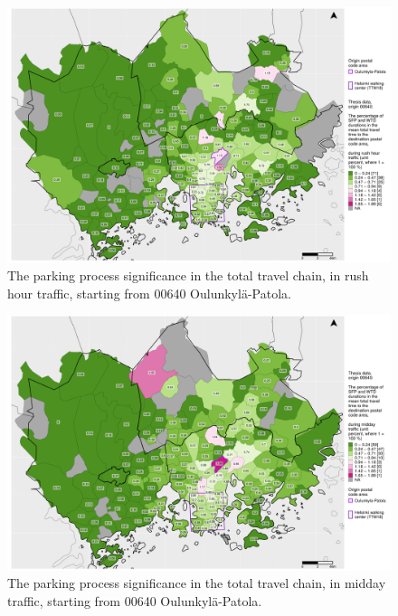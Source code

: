 \begin{figure}[H]%
    \centering
    \includegraphics[trim={0.9cm 0.3cm 0.25cm 0.3cm},clip,width=\textwidth]{images/compare_traveltimes_mapfill-msc_r_pct_fromzip-00640_28-09-2020.png}
    \caption[Parking process significance from Oulunkylä-Patola, rush hour traffic]{The parking process significance in the total travel chain, in rush hour traffic, starting from 00640 Oulunkylä-Patola.}%
    \label{fig:compare_msc_r_pct_00640}%
\end{figure}

\begin{figure}[H]%
    \centering
    \includegraphics[trim={0.9cm 0.3cm 0.25cm 0.3cm},clip,width=\textwidth]{images/compare_traveltimes_mapfill-msc_m_pct_fromzip-00640_28-09-2020.png}
    \caption[Parking process significance from Oulunkylä-Patola, midday traffic]{The parking process significance in the total travel chain, in midday traffic, starting from 00640 Oulunkylä-Patola.}%
    \label{fig:compare_msc_m_pct_00640}%
\end{figure}

